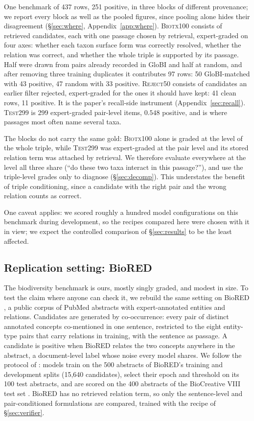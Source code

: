 \documentclass[11pt]{article}
\begin{document}
One benchmark of 437 rows, 251 positive, in three blocks of different provenance; we report every
block as well as the pooled figures, since pooling alone hides their disagreement (\S\ref{sec:where},
Appendix~\ref{app:where}). \textsc{Biotx100} consists of retrieved candidates, each with one passage chosen
by retrieval, expert-graded on four axes: whether each taxon surface form was correctly resolved,
whether the relation was correct, and whether the whole triple is supported by its passage. Half
were drawn from pairs already recorded in GloBI and half at random, and after removing three
training duplicates it contributes 97 rows: 50 GloBI-matched with 43 positive, 47 random with 33
positive.  \textsc{Reject50} consists of candidates an earlier filter rejected, expert-graded for the ones it should have kept: 41 clean rows, 11
positive. It is the paper's recall-side instrument (Appendix~\ref{sec:recall}). \textsc{Test299} is
299 expert-graded pair-level items, $0.548$ positive, and is where passages most often name several
taxa.

The blocks do not carry the same gold: \textsc{Biotx100} alone is graded at the level of the whole
triple, while \textsc{Test299} was expert-graded at the pair level and its stored relation term was
attached by retrieval. We therefore evaluate everywhere at the level all three share (``do these two taxa interact in this passage?''), and use the triple-level grades only to diagnose
(\S\ref{sec:decomp}). This understates the benefit of triple conditioning, since a candidate with the
right pair and the wrong relation counts as correct.

One caveat applies: we scored roughly a hundred model configurations on this benchmark during development, so the recipes compared here were chosen with it in view; we expect the controlled comparison of \S\ref{sec:results} to be the least affected.

\subsection{Replication setting: BioRED}
\label{sec:biored-setup}

The biodiversity benchmark is ours, mostly singly graded, and modest in size. To test the claim
where anyone can check it, we rebuild the same setting on BioRED \citep{luo2022biored}, a public
corpus of PubMed abstracts with expert-annotated entities and relations. Candidates are generated
by co-occurrence: every pair of distinct annotated concepts co-mentioned in one sentence, restricted
to the eight entity-type pairs that carry relations in training, with the sentence as passage. A candidate is positive when BioRED relates
the two concepts anywhere in the abstract, a document-level label whose noise every model shares.
We follow the protocol of \citet{lai2025bioredirect}: models train on the 500 abstracts of BioRED's
training and development splits (15{,}640 candidates), select their epoch and threshold on its 100
test abstracts, and are scored on the 400 abstracts of the BioCreative VIII test set
\citep{islamaj2024overview}. BioRED has no retrieved relation term, so only the sentence-level and
pair-conditioned formulations are compared, trained with the recipe of \S\ref{sec:verifier}.
\end{document}
